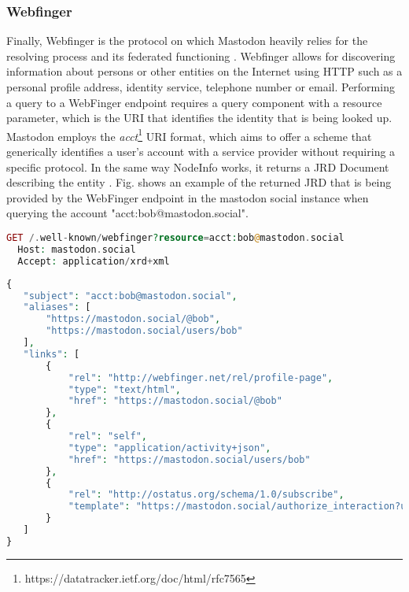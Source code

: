 \subsubsection{Webfinger}
Finally, Webfinger is the protocol on which Mastodon heavily relies for the resolving process and its federated functioning \cite{rochko_2020}. Webfinger allows for discovering information about persons or other entities on the Internet using HTTP such as a personal profile address, identity service, telephone number or email. Performing a query to a WebFinger endpoint requires a query component with a resource parameter, which is the URI that identifies the identity that is being looked up. Mastodon employs the \emph{acct}\footnote{https://datatracker.ietf.org/doc/html/rfc7565} URI format, which aims to offer a scheme that generically identifies a user's account with a service provider without requiring a specific protocol. In the same way NodeInfo works, it returns a JRD Document describing the entity \cite{jones_salgueiro_jones_smarr_2013}.  Fig. \label{Webfinger response from mastodon.social} shows an example of the returned JRD that is being provided by the WebFinger endpoint in the mastodon social instance when querying the account "acct:bob@mastodon.social".

\lstset{style=JSONStyle}
\begin{lstlisting}[language=PHP, caption=HTTP request to Webfinger endpoint, label=Webfinger request, float=h]
  GET /.well-known/webfinger?resource=acct:bob@mastodon.social
  Host: mastodon.social
  Accept: application/xrd+xml
\end{lstlisting}

\lstset{style=JSONStyle}
\begin{lstlisting}[language=PHP, caption=Webfinger response, label=Webfinger response from mastodon.social, float=h]
{
   "subject": "acct:bob@mastodon.social",
   "aliases": [
       "https://mastodon.social/@bob",
       "https://mastodon.social/users/bob"
   ],
   "links": [
       {
           "rel": "http://webfinger.net/rel/profile-page",
           "type": "text/html",
           "href": "https://mastodon.social/@bob"
       },
       {
           "rel": "self",
           "type": "application/activity+json",
           "href": "https://mastodon.social/users/bob"
       },
       {
           "rel": "http://ostatus.org/schema/1.0/subscribe",
           "template": "https://mastodon.social/authorize_interaction?uri={uri}"
       }
   ]
}
\end{lstlisting}


